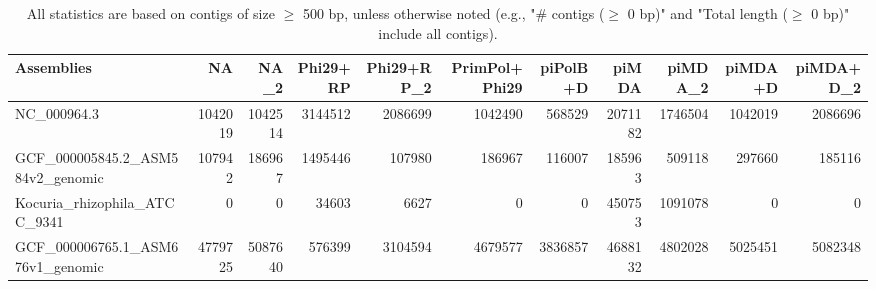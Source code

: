 \documentclass[12pt,a4paper]{article}
\begin{document}
\begin{table}[ht]
\begin{center}
\caption{All statistics are based on contigs of size $\geq$ 500 bp, unless otherwise noted (e.g., "\# contigs ($\geq$ 0 bp)" and "Total length ($\geq$ 0 bp)" include all contigs).}
\begin{tabular}{|l*{10}{|r}|}
\hline
Assemblies & NA & NA\_2 & Phi29+RP & Phi29+RP\_2 & PrimPol+Phi29 & piPolB+D & piMDA & piMDA\_2 & piMDA+D & piMDA+D\_2 \\ \hline
NC\_000964.3 & 1042019 & 1042514 & 3144512 & 2086699 & 1042490 & 568529 & 2071182 & 1746504 & 1042019 & 2086696 \\ \hline
GCF\_000005845.2\_ASM584v2\_genomic & 107942 & 186967 & 1495446 & 107980 & 186967 & 116007 & 185963 & 509118 & 297660 & 185116 \\ \hline
Kocuria\_rhizophila\_ATCC\_9341 & 0 & 0 & 34603 & 6627 & 0 & 0 & 450753 & 1091078 & 0 & 0 \\ \hline
GCF\_000006765.1\_ASM676v1\_genomic & 4779725 & 5087640 & 576399 & 3104594 & 4679577 & 3836857 & 4688132 & 4802028 & 5025451 & 5082348 \\ \hline
\end{tabular}
\end{center}
\end{table}
\end{document}
